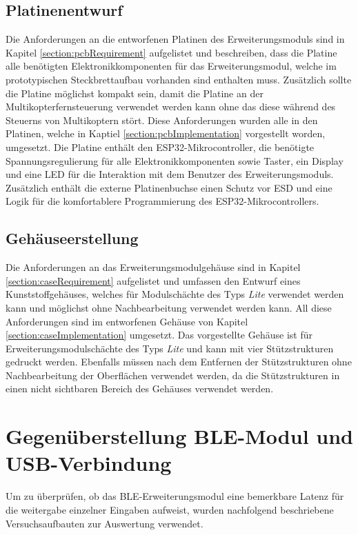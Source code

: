 \subsection{Platinenentwurf}
Die Anforderungen an die entworfenen Platinen des Erweiterungsmoduls sind in Kapitel \ref{section:pcbRequirement} aufgelistet und beschreiben, dass die Platine alle benötigten Elektronikkomponenten für das Erweiterungsmodul, welche im prototypischen Steckbrettaufbau vorhanden sind enthalten muss. Zusätzlich sollte die Platine möglichst kompakt sein, damit die Platine an der Multikopterfernsteuerung verwendet werden kann ohne das diese während des Steuerns von Multikoptern stört. Diese Anforderungen wurden alle in den Platinen, welche in Kaptiel \ref{section:pcbImplementation} vorgestellt worden, umgesetzt. Die Platine enthält den ESP32-Mikrocontroller, die benötigte Spannungsregulierung für alle Elektronikkomponenten sowie Taster, ein Display und eine \ac{LED} für die Interaktion mit dem Benutzer des Erweiterungsmoduls. Zusätzlich enthält die externe Platinenbuchse einen Schutz vor \ac{ESD} und eine Logik für die komfortablere Programmierung des ESP32-Mikrocontrollers.

\subsection{Gehäuseerstellung}
Die Anforderungen an das Erweiterungsmodulgehäuse sind in Kapitel \ref{section:caseRequirement} aufgelistet und umfassen den Entwurf eines Kunststoffgehäuses, welches für Modulschächte des Typs \textit{Lite} verwendet werden kann und möglichst ohne Nachbearbeitung verwendet werden kann. All diese Anforderungen sind im entworfenen Gehäuse von Kapitel \ref{section:caseImplementation} umgesetzt. Das vorgestellte Gehäuse ist für Erweiterungsmodulschächte des Typs \textit{Lite} und kann mit vier Stützstrukturen gedruckt werden. Ebenfalls müssen nach dem Entfernen der Stützstrukturen ohne Nachbearbeitung der Oberflächen verwendet werden, da die Stützstrukturen in einen nicht sichtbaren Bereich des Gehäuses verwendet werden.

\section{Gegenüberstellung \acs{BLE}-Modul und USB-Verbindung}
Um zu überprüfen, ob das \ac{BLE}-Erweiterungsmodul eine bemerkbare Latenz für die weitergabe einzelner Eingaben aufweist, wurden nachfolgend beschriebene Versuchsaufbauten zur Auswertung verwendet.

